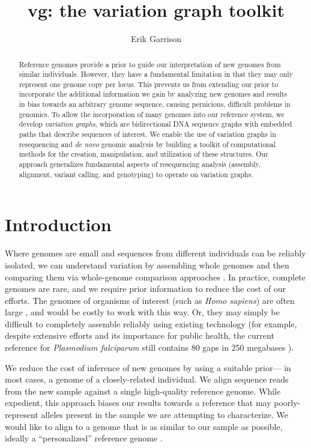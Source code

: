 \documentclass{article}
\begin{document}
\title{vg: the variation graph toolkit}

\author{Erik Garrison}

\maketitle

\begin{abstract}
Reference genomes provide a prior to guide our interpretation of new genomes from similar individuals.
However, they have a fundamental limitation in that they may only represent one genome copy per locus.
This prevents us from extending our prior to incorporate the additional information we gain by analyzing new genomes and results in bias towards an arbitrary genome sequence, causing pernicious, difficult problems in genomics.
To allow the incorporation of many genomes into our reference system, we develop \emph{variation graphs}, which are bidirectional DNA sequence graphs with embedded paths that describe sequences of interest.
We enable the use of variation graphs in resequencing and \emph{de novo} genomic analysis by building a toolkit of computational methods for the creation, manipulation, and utilization of these structures.
Our approach generalizes fundamental aspects of resequencing analysis (assembly, alignment, variant calling, and genotyping) to operate on variation graphs.
\end{abstract}

\section{Introduction}

Where genomes are small and sequences from different individuals can be reliably isolated, we can understand variation by assembling whole genomes and then comparing them via whole-genome comparison approaches \cite{mummer}.
In practice, complete genomes are rare, and we require prior information to reduce the cost of our efforts.
The genomes of organisms of interest (such as \emph{Homo sapiens}) are often large \cite{pmid11237011}, and would be costly to work with this way.
Or, they may simply be difficult to completely assemble reliably using existing technology (for example, despite extensive efforts and its importance for public health, the current reference for \emph{Plasmodium falciparum} still contains 80 gaps in 250 megabases \cite{pfalciparum, pfalciparumweb}).

We reduce the cost of inference of new genomes by using a suitable prior--- in most cases, a genome of a closely-related individual.
We align sequence reads from the new sample against a single high-quality reference genome.
While expedient, this approach biases our results towards a reference that may poorly-represent alleles present in the sample we are attempting to characterize.
We would like to align to a genome that is as similar to our sample as possible, ideally a ``personalized'' reference genome \cite{Yuan_2012}.
\end{document}
